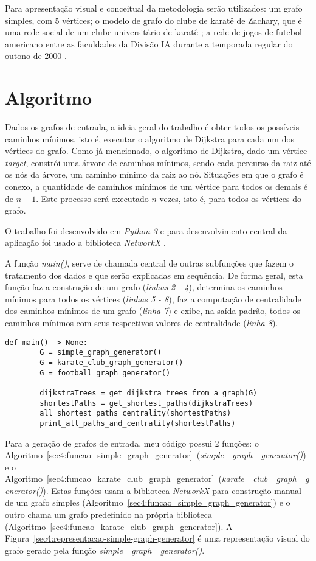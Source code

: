 Para apresentação visual e conceitual da metodologia serão utilizados: um grafo simples, com 5 vértices; o modelo de grafo do clube de karatê de Zachary, que é uma rede social de um clube universitário de karatê \cite{zachary2009}; a rede de jogos de futebol americano entre as faculdades da Divisão IA durante a temporada regular do outono de 2000 \cite{networkxfootball2021}.

\section{Algoritmo}
Dados os grafos de entrada, a ideia geral do trabalho é obter todos os possíveis caminhos mínimos, isto é, executar o algoritmo de Dijkstra para cada um dos vértices do grafo. Como já mencionado, o algoritmo de Dijkstra, dado um vértice \emph{target}, constrói uma árvore de caminhos mínimos, sendo cada percurso da raiz até os nós da árvore, um caminho mínimo da raiz ao nó. Situações em que o grafo é conexo, a quantidade de caminhos mínimos de um vértice para todos os demais é de $n - 1$. Este processo será executado $n$ vezes, isto é, para todos os vértices do grafo.

O trabalho foi desenvolvido em \emph{Python 3} e para desenvolvimento central da aplicação foi usado a biblioteca \emph{NetworkX} \cite{networkx2021}.

A função \emph{main()}, serve de chamada central de outras subfunções que fazem o tratamento dos dados e que serão explicadas em sequência. De forma geral, esta função faz a construção de um grafo (\emph{linhas 2 - 4}), determina os caminhos mínimos para todos os vértices (\emph{linhas 5 - 8}), faz a computação de centralidade dos caminhos mínimos de um grafo (\emph{linha 7}) e exibe, na saída padrão, todos os caminhos mínimos com seus respectivos valores de centralidade (\emph{linha 8}).

\begin{lstlisting}[caption={Função central para chamada de subfunções.}]
	def main() -> None:
		G = simple_graph_generator()
		G = karate_club_graph_generator()
		G = football_graph_generator()

		dijkstraTrees = get_dijkstra_trees_from_a_graph(G)
		shortestPaths = get_shortest_paths(dijkstraTrees)
		all_shortest_paths_centrality(shortestPaths)
		print_all_paths_and_centrality(shortestPaths)
\end{lstlisting}

Para a geração de grafos de entrada, meu código possui 2 funções: o Algoritmo~\ref{sec4:funcao_simple_graph_generator}~(\mbox{\emph{simple~\textunderscore~graph~\textunderscore~generator()}}) e o Algoritmo~\ref{sec4:funcao_karate_club_graph_generator}~(\mbox{\emph{karate~\textunderscore~club~\textunderscore~graph~\textunderscore~generator()}}). Estas funções usam a biblioteca \emph{NetworkX} para construção manual de um grafo simples (Algoritmo~\ref{sec4:funcao_simple_graph_generator}) e o outro chama um grafo predefinido na própria biblioteca (Algoritmo~\ref{sec4:funcao_karate_club_graph_generator}). A Figura~\ref{sec4:representacao-simple-graph-generator} é uma representação visual do grafo gerado pela função \mbox{\emph{simple~\textunderscore~graph~\textunderscore~generator()}}.

